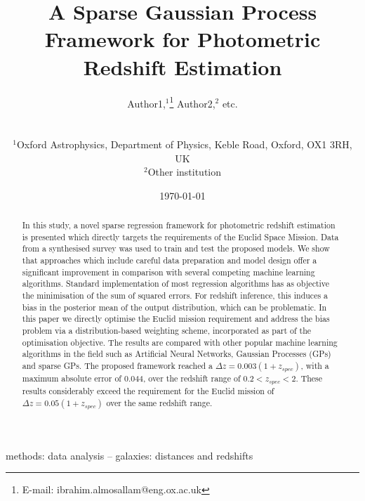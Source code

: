 \documentclass[useAMS,usenatbib,fleqn]{mn2e}
\title[A Sparse Gaussian Process Framework for Photometric Redshift Estimation]{A Sparse Gaussian Process Framework for Photometric Redshift Estimation}
\author[Almosallam et al.]
{\parbox{\textwidth}{Author1,$^1$\thanks{E-mail: ibrahim.almosallam@eng.ox.ac.uk}
Author2,$^{2}$ etc.
}
\vspace{0.4cm}\\
\parbox{\textwidth}{
$^1$Oxford Astrophysics, Department of Physics, Keble Road, Oxford, OX1 3RH, UK\\
$^2$Other institution \\
}}
\begin{document}
\date{\today}

\pagerange{\pageref{firstpage}--\pageref{lastpage}} 

\maketitle

\label{first page}

\begin{abstract}
In this study, a novel sparse regression framework for photometric redshift estimation is presented which directly targets the requirements of the Euclid Space Mission. Data from a synthesised survey was used to train and test the proposed models. We show that approaches which include careful data preparation and model design offer a significant improvement in comparison with several competing machine learning algorithms. Standard implementation of most regression algorithms has as objective the minimisation of the sum of squared errors. For redshift inference, this induces a bias in the posterior mean of the output distribution, which can be problematic. In this paper we directly optimise the Euclid mission requirement and address the bias problem via a distribution-based weighting scheme, incorporated as part of the optimisation objective. The results are compared with other popular machine learning algorithms in the field such as Artificial Neural Networks, Gaussian Processes (GPs) and sparse GPs. The proposed framework reached a $\Delta z = 0.003(1+z_{spec})$, with a maximum absolute error of 0.044, over the redshift range of $0.2 < z_{spec} < 2$. These results considerably exceed the requirement for the Euclid mission of $\Delta z = 0.05(1+z_{spec})$ over the same redshift range.

\end{abstract}

\begin{keywords}
methods: data analysis -- galaxies: distances and redshifts
\end{keywords}
\end{document}
